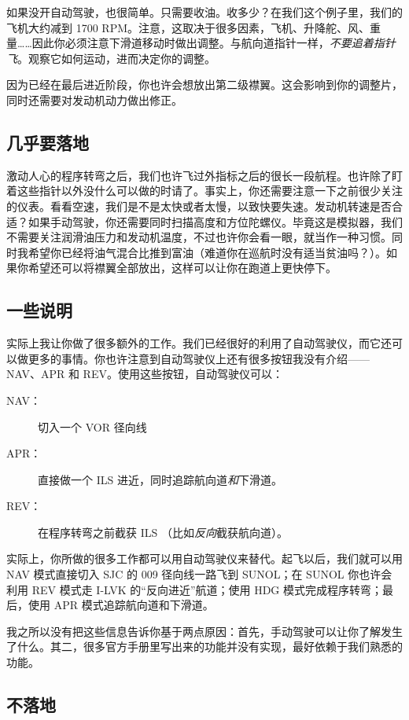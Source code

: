 如果没开自动驾驶，也很简单。只需要收油。收多少？在我们这个例子里，我们的飞机大约减到 1700 RPM。注意，这取决于很多因素，飞机、升降舵、风、重量……因此你必须注意下滑道移动时做出调整。与航向道指针一样，\emph{不要追着指针飞}。观察它如何运动，进而决定你的调整。

因为已经在最后进近阶段，你也许会想放出第二级襟翼。这会影响到你的调整片，同时还需要对发动机动力做出修正。

\subsection{几乎要落地}

激动人心的程序转弯之后，我们也许飞过外指标之后的很长一段航程。也许除了盯着这些指针以外没什么可以做的时请了。事实上，你还需要注意一下之前很少关注的仪表。看看空速，我们是不是太快或者太慢，以致快要失速。发动机转速是否合适？如果手动驾驶，你还需要同时扫描高度和方位陀螺仪。毕竟这是模拟器，我们不需要关注润滑油压力和发动机温度，不过也许你会看一眼，就当作一种习惯。同时我希望你已经将油气混合比推到富油（难道你在巡航时没有适当贫油吗？）。如果你希望还可以将襟翼全部放出，这样可以让你在跑道上更快停下。

\subsection{一些说明}

实际上我让你做了很多额外的工作。我们已经很好的利用了自动驾驶仪，而它还可以做更多的事情。你也许注意到自动驾驶仪上还有很多按钮我没有介绍——NAV、APR 和 REV。使用这些按钮，自动驾驶仪可以：

\begin{description}
\item[NAV：] 切入一个 VOR 径向线
\item[APR：] 直接做一个 ILS 进近，同时追踪航向道\emph{和}下滑道。
\item[REV：] 在程序转弯之前截获 ILS （比如\emph{反向}截获航向道）。
\end{description}

实际上，你所做的很多工作都可以用自动驾驶仪来替代。起飞以后，我们就可以用 NAV 模式直接切入 SJC 的 009 径向线一路飞到 SUNOL；在 SUNOL 你也许会利用 REV 模式走 I-LVK 的“反向进近”航道；使用 HDG 模式完成程序转弯；最后，使用 APR 模式追踪航向道和下滑道。

我之所以没有把这些信息告诉你基于两点原因：首先，手动驾驶可以让你了解发生了什么。其二，很多官方手册里写出来的功能并没有实现，最好依赖于我们熟悉的功能。

\subsection{不落地}

